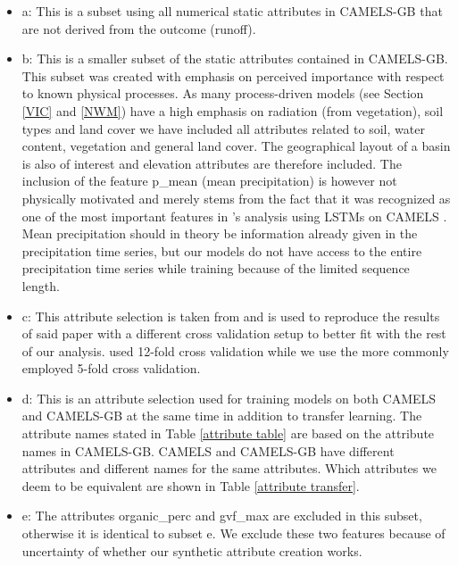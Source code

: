 \begin{itemize}
    \item a: This is a subset using all numerical static attributes in CAMELS-GB 
        \citep{CAMELS_GB} that are not derived from the outcome (runoff). 
    \item b: This is a smaller subset of the static attributes contained in CAMELS-GB. 
        This subset was created with emphasis on perceived importance with respect 
        to known physical processes. As many process-driven models (see Section \ref{VIC} and \ref{NWM}) have a high 
        emphasis on radiation (from vegetation), soil types and land cover we have 
        included all attributes related to soil, water content, vegetation and general land cover. 
        The geographical layout of a basin is also of interest and elevation attributes 
        are therefore included. The inclusion of the feature p\_mean (mean precipitation)
        is however not 
        physically motivated and merely stems from the fact that it was recognized 
        as one of the most important features in \citet{lstm_second_paper}'s analysis 
        using LSTMs on CAMELS \citep{CAMELS_US}. Mean precipitation should in 
        theory be information already given in the precipitation time series, but 
        our models do not have access to the entire precipitation time series while 
        training because of the limited sequence length. 
    \item c: This attribute selection is taken from \cite{lstm_third_paper} and 
        is used to reproduce the results of said paper with a different cross validation 
        setup to better fit with the rest of our analysis. \cite{lstm_third_paper} 
        used 12-fold cross validation while we use the more commonly employed 
        5-fold cross validation. 
    \item d: This is an attribute selection used for training models on both 
        CAMELS and CAMELS-GB at the same time in addition to transfer learning. 
        The attribute names stated in Table \ref{attribute table} are based on the 
        attribute names in CAMELS-GB. CAMELS and CAMELS-GB have different attributes 
        and different names for the same attributes. Which attributes we deem to 
        be equivalent are shown in Table \ref{attribute transfer}.
    \item e: The attributes organic\_perc and gvf\_max are excluded in this subset, 
        otherwise it is identical to subset e. We exclude these two features because 
        of uncertainty of whether our synthetic attribute creation works.
\end{itemize}

